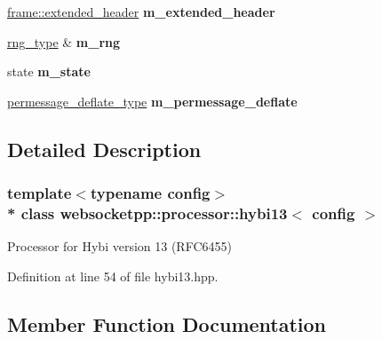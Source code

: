 \begin{DoxyCompactItemize}
\item 
\hyperlink{structwebsocketpp_1_1frame_1_1extended__header}{frame\+::extended\+\_\+header} {\bfseries m\+\_\+extended\+\_\+header}\hypertarget{classwebsocketpp_1_1processor_1_1hybi13_a7d11d41110cd4b4e746a55ecd9faaaf1}{}\label{classwebsocketpp_1_1processor_1_1hybi13_a7d11d41110cd4b4e746a55ecd9faaaf1}

\item 
\hyperlink{classwebsocketpp_1_1random_1_1none_1_1int__generator}{rng\+\_\+type} \& {\bfseries m\+\_\+rng}\hypertarget{classwebsocketpp_1_1processor_1_1hybi13_a3e6ee5afc8a635c0a410f678bda8ea84}{}\label{classwebsocketpp_1_1processor_1_1hybi13_a3e6ee5afc8a635c0a410f678bda8ea84}

\item 
state {\bfseries m\+\_\+state}\hypertarget{classwebsocketpp_1_1processor_1_1hybi13_a4660c14a2a241a2439fb3aa497ab5886}{}\label{classwebsocketpp_1_1processor_1_1hybi13_a4660c14a2a241a2439fb3aa497ab5886}

\item 
\hyperlink{classwebsocketpp_1_1extensions_1_1permessage__deflate_1_1disabled}{permessage\+\_\+deflate\+\_\+type} {\bfseries m\+\_\+permessage\+\_\+deflate}\hypertarget{classwebsocketpp_1_1processor_1_1hybi13_a9103ac43ba28b3b3e5cedf519b1c67c5}{}\label{classwebsocketpp_1_1processor_1_1hybi13_a9103ac43ba28b3b3e5cedf519b1c67c5}

\end{DoxyCompactItemize}


\subsection{Detailed Description}
\subsubsection*{template$<$typename config$>$\\*
class websocketpp\+::processor\+::hybi13$<$ config $>$}

Processor for Hybi version 13 (R\+F\+C6455) 

Definition at line 54 of file hybi13.\+hpp.



\subsection{Member Function Documentation}
